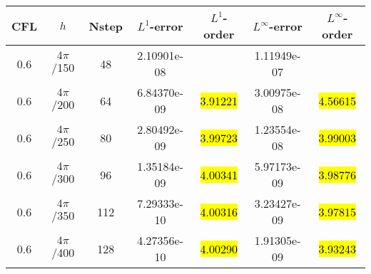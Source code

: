 \def\titleintable{CFL&$h$&Nstep&$L^1$-error&$L^1$-order&$L^\infty$-error&$L^\infty$-order\\}

\begin{table}[htbp]
  \label{ta:2D-ex3-WHC4}
  \centering
  \begin{tabular}{ccccccc}
    \toprule
    \titleintable
    \midrule
    0.6 & $4\pi$/150 & 48  & 2.10901e-08 &              & 1.11949e-07 &              \\
    0.6 & $4\pi$/200 & 64  & 6.84370e-09 & \hl{3.91221} & 3.00975e-08 & \hl{4.56615} \\
    0.6 & $4\pi$/250 & 80  & 2.80492e-09 & \hl{3.99723} & 1.23554e-08 & \hl{3.99003} \\
    0.6 & $4\pi$/300 & 96  & 1.35184e-09 & \hl{4.00341} & 5.97173e-09 & \hl{3.98776} \\
    0.6 & $4\pi$/350 & 112 & 7.29333e-10 & \hl{4.00316} & 3.23427e-09 & \hl{3.97815} \\
    0.6 & $4\pi$/400 & 128 & 4.27356e-10 & \hl{4.00290} & 1.91305e-09 & \hl{3.93243} \\
    \bottomrule
  \end{tabular}
\end{table}

